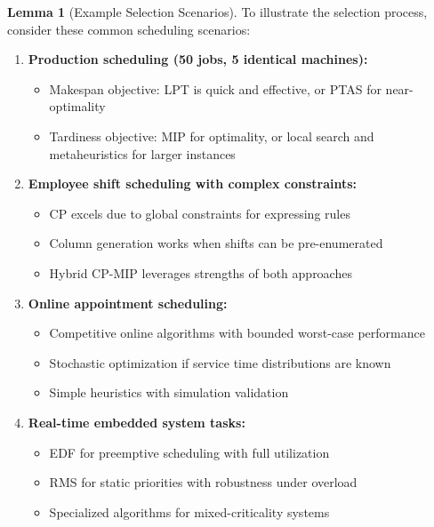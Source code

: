 \documentclass{article}
\theoremstyle{definition}
\newtheorem{lemma}{Lemma}
\begin{document}
\begin{lemma}[Example Selection Scenarios]
To illustrate the selection process, consider these common scheduling scenarios:

\begin{enumerate}
    \item \textbf{Production scheduling (50 jobs, 5 identical machines):}
    \begin{itemize}
        \item Makespan objective: LPT is quick and effective, or PTAS for near-optimality
        \item Tardiness objective: MIP for optimality, or local search and metaheuristics for larger instances
    \end{itemize}
    
    \item \textbf{Employee shift scheduling with complex constraints:}
    \begin{itemize}
        \item CP excels due to global constraints for expressing rules
        \item Column generation works when shifts can be pre-enumerated
        \item Hybrid CP-MIP leverages strengths of both approaches
    \end{itemize}
    
    \item \textbf{Online appointment scheduling:}
    \begin{itemize}
        \item Competitive online algorithms with bounded worst-case performance
        \item Stochastic optimization if service time distributions are known
        \item Simple heuristics with simulation validation
    \end{itemize}
    
    \item \textbf{Real-time embedded system tasks:}
    \begin{itemize}
        \item EDF for preemptive scheduling with full utilization
        \item RMS for static priorities with robustness under overload
        \item Specialized algorithms for mixed-criticality systems
    \end{itemize}
\end{enumerate}
\end{lemma}
\end{document}
